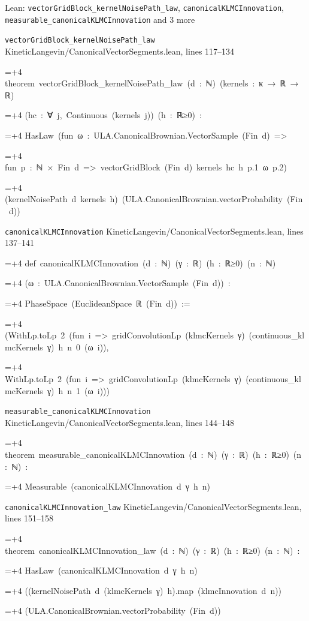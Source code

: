 \documentclass[11pt,a4paper]{article}
\newlength{\leancharwidth}
\newenvironment{leancode}{\par\smallskip\begingroup\ttfamily\footnotesize\raggedright
  \settowidth{\leancharwidth}{M}\setlength{\parskip}{0pt}\setlength{\parindent}{0pt}
  \frenchspacing}{\par\endgroup\smallskip}
\newcommand{\leanline}[2]{\hangindent=\dimexpr#1\leancharwidth+4\leancharwidth\relax
  \hangafter=1\noindent\hspace*{#1\leancharwidth}#2\par}
\newcommand{\leansource}[1]{\par{\footnotesize\color{leanmuted}#1}\par}
\begin{document}
\begin{leanbox}{Lean: \texttt{vectorGridBlock\_\allowbreak{}kernelNoisePath\_\allowbreak{}law}, \texttt{canonicalKLMCInnovation}, \texttt{measurable\_\allowbreak{}canonicalKLMCInnovation} and 3 more}
\leansource{\texttt{vectorGridBlock\_\allowbreak{}kernelNoisePath\_\allowbreak{}law} \quad KineticLangevin/\allowbreak{}CanonicalVectorSegments.lean, lines 117–134}
\begin{leancode}
\leanline{0}{theorem\ vectorGridBlock\_kernelNoisePath\_law\ (d\ :\ ℕ)\ (kernels\ :\ κ\ →\ ℝ\ →\ ℝ)}
\leanline{4}{(hc\ :\ ∀\ j,\ Continuous\ (kernels\ j))\ (h\ :\ ℝ≥0)\ :}
\leanline{4}{HasLaw\ (fun\ ω\ :\ ULA.CanonicalBrownian.VectorSample\ (Fin\ d)\ =>}
\leanline{6}{fun\ p\ :\ ℕ\ ×\ Fin\ d\ =>\ vectorGridBlock\ (Fin\ d)\ kernels\ hc\ h\ p.1\ ω\ p.2)}
\leanline{6}{(kernelNoisePath\ d\ kernels\ h)\ (ULA.CanonicalBrownian.vectorProbability\ (Fin\ d))}
\end{leancode}
\leansource{\texttt{canonicalKLMCInnovation} \quad KineticLangevin/\allowbreak{}CanonicalVectorSegments.lean, lines 137–141}
\begin{leancode}
\leanline{0}{def\ canonicalKLMCInnovation\ (d\ :\ ℕ)\ (γ\ :\ ℝ)\ (h\ :\ ℝ≥0)\ (n\ :\ ℕ)}
\leanline{4}{(ω\ :\ ULA.CanonicalBrownian.VectorSample\ (Fin\ d))\ :}
\leanline{4}{PhaseSpace\ (EuclideanSpace\ ℝ\ (Fin\ d))\ :=}
\leanline{2}{(WithLp.toLp\ 2\ (fun\ i\ =>\ gridConvolutionLp\ (klmcKernels\ γ)\ (continuous\_klmcKernels\ γ)\ h\ n\ 0\ (ω\ i)),}
\leanline{3}{WithLp.toLp\ 2\ (fun\ i\ =>\ gridConvolutionLp\ (klmcKernels\ γ)\ (continuous\_klmcKernels\ γ)\ h\ n\ 1\ (ω\ i)))}
\end{leancode}
\leansource{\texttt{measurable\_\allowbreak{}canonicalKLMCInnovation} \quad KineticLangevin/\allowbreak{}CanonicalVectorSegments.lean, lines 144–148}
\begin{leancode}
\leanline{0}{theorem\ measurable\_canonicalKLMCInnovation\ (d\ :\ ℕ)\ (γ\ :\ ℝ)\ (h\ :\ ℝ≥0)\ (n\ :\ ℕ)\ :}
\leanline{4}{Measurable\ (canonicalKLMCInnovation\ d\ γ\ h\ n)}
\end{leancode}
\leansource{\texttt{canonicalKLMCInnovation\_\allowbreak{}law} \quad KineticLangevin/\allowbreak{}CanonicalVectorSegments.lean, lines 151–158}
\begin{leancode}
\leanline{0}{theorem\ canonicalKLMCInnovation\_law\ (d\ :\ ℕ)\ (γ\ :\ ℝ)\ (h\ :\ ℝ≥0)\ (n\ :\ ℕ)\ :}
\leanline{4}{HasLaw\ (canonicalKLMCInnovation\ d\ γ\ h\ n)}
\leanline{6}{((kernelNoisePath\ d\ (klmcKernels\ γ)\ h).map\ (klmcInnovation\ d\ n))}
\leanline{6}{(ULA.CanonicalBrownian.vectorProbability\ (Fin\ d))}

\end{leancode}
\end{leanbox}
\end{document}
